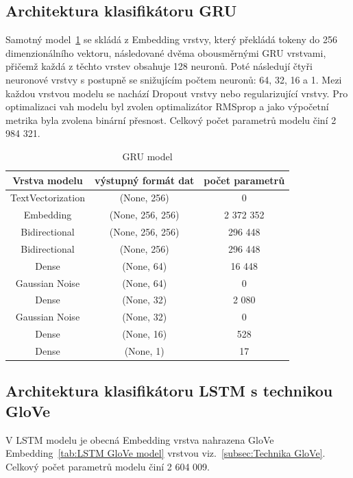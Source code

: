 \subsection{Architektura klasifikátoru GRU}\label{arch: GRU}
Samotný model~\ref{tab:GRU model} se skládá z Embedding vrstvy, který překládá tokeny do 256 dimenzionálního vektoru, následované dvěma obousměrnými GRU vrstvami, přičemž každá z těchto vrstev obsahuje 128 neuronů.
Poté následují čtyři neuronové vrstvy s postupně se snižujícím počtem neuronů: 64, 32, 16 a 1.
Mezi každou vrstvou modelu se nachází Dropout vrstvy nebo regularizující vrstvy.
Pro optimalizaci vah modelu byl zvolen optimalizátor RMSprop a jako výpočetní metrika byla zvolena binární přesnost.
Celkový počet parametrů modelu činí 2 984 321.

\begin{table}[H]
	\centering
	\caption{GRU model}\label{tab:GRU model}
	\begin{tabular}{ c c c }
			\toprule
			Vrstva modelu & výstupný formát dat & počet parametrů\\
			\midrule
            TextVectorization & (None, 256) & 0\\         
            Embedding & (None, 256, 256) & 2 372 352\\   
            Bidirectional & (None, 256, 256) & 296 448\\    
            Bidirectional & (None, 256) & 296 448\\
            Dense & (None, 64) & 16 448\\ 
			Gaussian Noise & (None, 64) & 0\\
			Dense & (None, 32) & 2 080\\ 
			Gaussian Noise & (None, 32) & 0\\
			Dense & (None, 16) & 528\\ 
            Dense & (None, 1) & 17\\ 
			\midrule
		\end{tabular}
\end{table}


\subsection{Architektura klasifikátoru LSTM s technikou GloVe}\label{arch: LSTM GloVe}
V LSTM modelu je obecná Embedding vrstva nahrazena GloVe Embedding~\ref{tab:LSTM GloVe model} vrstvou viz.~\ref{subsec:Technika GloVe}.
Celkový počet parametrů modelu činí 2 604 009.

